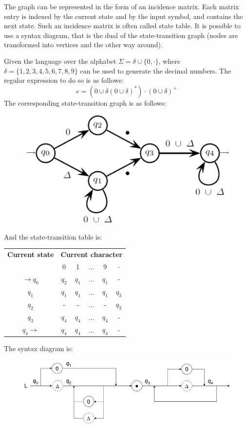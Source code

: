 The graph can be represented in the form of an incidence matrix. 
Each matrix entry is indexed by the current state and by the input symbol, and contains the next state.
Such an incidence matrix is often called state table. 
It is possible to use a syntax diagram, that is the dual of the state-transition graph (nodes are transformed into vertices and the other way around).
\begin{example}
    Given the language over the alphabet $\Sigma=\delta \cup \{0,\cdot\}$, where $\delta=\{1,2,3,4,5,6,7,8,9\}$ can be used to generate the decimal numbers. 
    The regular expression to do so is as follows: 
    \[e=\left( 0 \cup \delta (0 \cup \delta)^{*} \right) \cdot (0 \cup \delta)^{+}\]
    The corresponding state-transition graph is as follows: 
    \begin{figure}[H]
        \centering
        \includegraphics[width=0.5\linewidth]{images/fsa1.png}
    \end{figure}
    And the state-transition table is: 
    \begin{table}[H]
        \centering
        \begin{tabular}{|c|ccccc|}
        \hline
        \textbf{Current state} & \multicolumn{5}{c|}{\textbf{Current character}}\\ \cline {2-6}
                               & 0      & 1      & $\dots$  & 9      & $\cdot$  \\ \hline
        $\rightarrow q_0$      & $q_2$  & $q_1$  & $\dots$  & $q_1$  & -        \\
        $q_1$                  & $q_1$  & $q_1$  & $\dots$  & $q_1$  & $q_3$    \\
        $q_2$                  & -      & -      & $\dots$  & -      & $q_3$    \\
        $q_3$                  & $q_4$  & $q_4$  & $\dots$  & $q_4$  & -        \\
        $q_4 \rightarrow$      & $q_4$  & $q_4$  & $\dots$  & $q_4$  & -        \\ \hline
        \end{tabular}
    \end{table}
    The syntax diagram is: 
    \begin{figure}[H]
        \centering
        \includegraphics[width=0.75\linewidth]{images/fsa2.png}
    \end{figure}
\end{example}